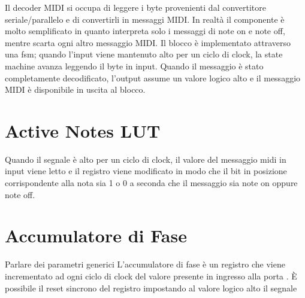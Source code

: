 \begin{center}
\end{center}
Il decoder MIDI si occupa di leggere i byte provenienti dal convertitore seriale/parallelo e di convertirli in messaggi MIDI.
In realtà il componente è molto semplificato in quanto interpreta solo i messaggi di note on e note off, mentre scarta ogni altro messaggio MIDI.
Il blocco è implementato attraverso una fsm; quando l'input  viene mantenuto alto per un ciclo di clock, la state machine avanza leggendo il byte  in input.
Quando il messaggio è stato completamente decodificato, l'output  assume un valore logico alto e il messaggio MIDI è disponibile in uscita al blocco.

\section{Active Notes LUT}
\label{sec:noteslut}

\begin{center}
\end{center}
Quando il segnale  è alto per un ciclo di clock, il valore del messaggio midi in input viene letto e il registro  viene modificato in modo che il bit in posizione corrispondente alla nota sia 1 o 0 a seconda che il messaggio sia note on oppure note off.

\section{Accumulatore di Fase}
\label{sec:phaseaccumulator}

\begin{center}
\end{center}
Parlare dei parametri generici
L'accumulatore di fase è un registro che viene incrementato ad ogni ciclo di clock del valore presente in ingresso alla porta .
È possibile il reset sincrono del registro impostando al valore logico alto il segnale 

